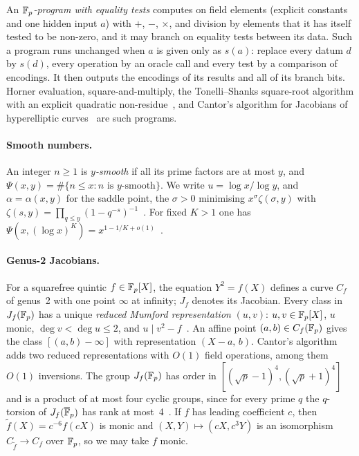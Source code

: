 An \emph{$\mathbb{F}_p$-program with equality tests} computes on field elements (explicit constants and one hidden
input $a$) with $+$, $-$, $\times$, and division by elements that it has itself tested to be non-zero, and it
may branch on equality tests between its data. Such a program runs unchanged when $a$ is given only as
$s(a)$: replace every datum $d$ by $s(d)$, every operation by an oracle call and every test by a comparison
of encodings. It then outputs the encodings of its results and all of its branch bits.
Horner evaluation, square-and-multiply, the Tonelli--Shanks square-root algorithm with an explicit
quadratic non-residue~\cite{Sha73}, and Cantor's algorithm for Jacobians of hyperelliptic
curves~\cite{Can87} are such programs.

\paragraph{Smooth numbers.}
An integer $n\ge1$ is \emph{$y$-smooth} if all its prime factors are at most $y$, and
$\Psi(x,y)=\#\{n\le x: n \text{ is } y\text{-smooth}\}$. We write $u=\log x/\log y$, and $\alpha=\alpha(x,y)$
for the saddle point, the $\sigma>0$ minimising $x^\sigma\zeta(\sigma,y)$ with
$\zeta(s,y)=\prod_{q\le y}(1-q^{-s})^{-1}$~\cite{HT86}. For fixed $K>1$ one has
$\Psi(x,(\log x)^K)=x^{1-1/K+o(1)}$~\cite{dB66,CEP83}.

\paragraph{Genus-2 Jacobians.}
For a squarefree quintic $f\in\mathbb{F}_p[X]$, the equation $Y^2=f(X)$ defines a curve $C_f$ of genus~2 with one
point $\infty$ at infinity; $J_f$ denotes its Jacobian. Every class in $J_f(\mathbb{F}_p)$ has a unique
\emph{reduced Mumford representation} $(u,v)$: $u,v\in\mathbb{F}_p[X]$, $u$ monic, $\deg v<\deg u\le2$, and
$u\mid v^2-f$~\cite{Can87}. An affine point $(a,b)\in C_f(\mathbb{F}_p)$ gives the class $[(a,b)-\infty]$ with
representation $(X-a,\,b)$. Cantor's algorithm adds two reduced representations with $O(1)$ field
operations, among them $O(1)$ inversions. The group $J_f(\mathbb{F}_p)$ has order in
$[(\sqrt p-1)^4,(\sqrt p+1)^4]$ and is a product of at most four cyclic groups, since for every prime $q$ the
$q$-torsion of $J_f(\overline{\mathbb{F}}_p)$ has rank at most~4~\cite{Mum70}. If $f$ has leading coefficient $c$,
then $\tilde f(X)=c^{-6}f(cX)$ is monic and $(X,Y)\mapsto(cX,c^3Y)$ is an isomorphism
$C_{\tilde f}\to C_f$ over $\mathbb{F}_p$, so we may take $f$ monic.
